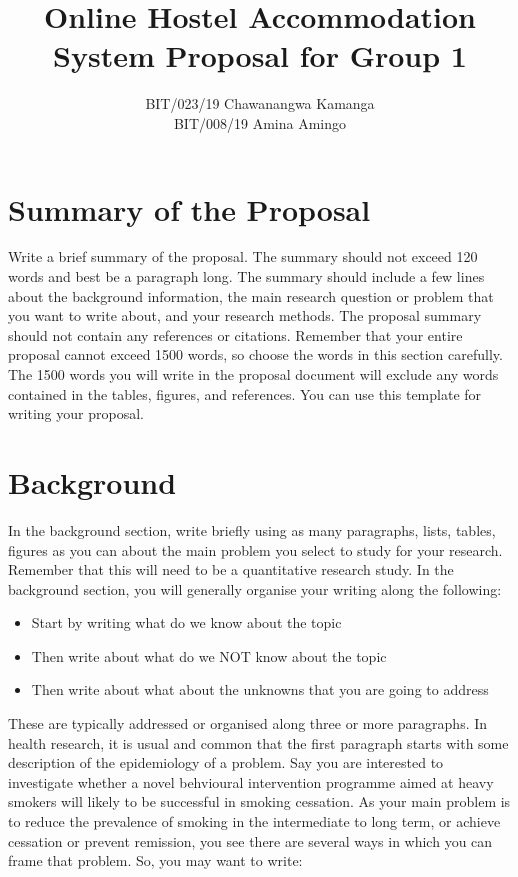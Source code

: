 \documentclass[a4paper]{article}
\title{Online Hostel Accommodation System Proposal for Group 1}
\author{BIT/023/19 Chawanangwa Kamanga \\ BIT/008/19 Amina Amingo}
\date{}
\begin{document}
\maketitle

\section*{Summary of the Proposal}

Write a brief summary of the proposal. The summary should not exceed 120 words and best be a paragraph long. The summary should include a few lines about the background information, the main research question or problem that you want to write about, and your research methods. The proposal summary should not contain any references or citations. Remember that your entire proposal cannot exceed 1500 words, so choose the words in this section carefully. The 1500 words you will write in the proposal document will exclude any words contained in the tables, figures, and references. You can use this template for writing your proposal. 

\section*{Background}

In the background section, write briefly using as many paragraphs, lists, tables, figures as you can about the main problem you select to study for your research. Remember that this will need to be a quantitative research study. In the background section, you will generally organise your writing along the following:

\begin{itemize}
\item Start by writing what do we know about the topic
\item Then write about what do we NOT know about the topic 
\item Then write about what about the unknowns that you are going to address
\end{itemize}

These are typically addressed or organised along three or more paragraphs. In health research, it is usual and common that the first paragraph starts with some description of the epidemiology of a problem. Say you are interested to investigate whether a novel behvioural intervention programme aimed at heavy smokers will likely to be successful in smoking cessation. As your main problem is to reduce the prevalence of smoking in the intermediate to long term, or achieve cessation or prevent remission, you see there are several ways in which you can frame that problem. So, you may want to write:
\end{document}
